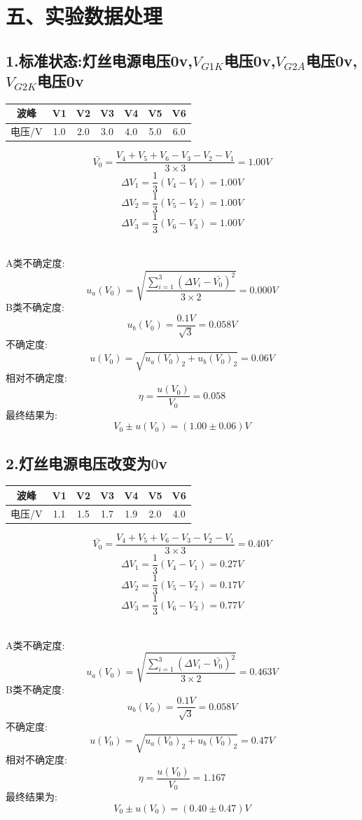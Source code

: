 \documentclass[11pt,a4paper,oneside]{article}
\begin{document}
\section*{五、实验数据处理}
\subsection*{1.标准状态:灯丝电源电压0v,$V_{G1K}$电压0v,$V_{G2A}$电压0v,$V_{G2K}$电压0v}
\begin{center}
\begin{tabular}{|c|c|c|c|c|c|c|}
	\hline
	波峰&V1&V2&V3&V4&V5&V6
	\\\hline
	电压/V&1.0&2.0&3.0&4.0&5.0&6.0\\\hline
	\end{tabular}
	\end{center}

$$  \bar{V_0}=\frac{V_4+V_5+V_6-V_3-V_2-V_1}{3\times 3}=1.00V $$
$$	\Delta V_1=\frac{1}{3}(V_4-V_1)=1.00V $$
$$	\Delta V_2=\frac{1}{3}(V_5-V_2)=1.00V $$
$$	\Delta V_3=\frac{1}{3}(V_6-V_3)=1.00V $$ 

\ \\
A类不确定度:
$$	u_a(V_0)=\sqrt{\frac{\sum\limits_{i=1}^{3} (\Delta V_i-\bar{V_0})^2}{3\times 2}}=0.000V $$
B类不确定度:
$$	u_b(V_0)=\frac{0.1V}{\sqrt{3}}=0.058V $$
不确定度:
$$	u(V_0)=\sqrt{u_a(V_0)_2+u_b(V_0)_2}=0.06V $$
相对不确定度:
$$	\eta=\frac{u(V_0)}{V_0}=0.058 $$
最终结果为:
$$	V_0 \pm u(V_0) = (1.00 \pm 0.06)V $$


\subsection*{2.灯丝电源电压改变为$0$v}
\begin{center}
\begin{tabular}{|c|c|c|c|c|c|c|}
	\hline
	波峰&V1&V2&V3&V4&V5&V6
	\\\hline
	电压/V&1.1&1.5&1.7&1.9&2.0&4.0\\\hline
	\end{tabular}
	\end{center}

$$  \bar{V_0}=\frac{V_4+V_5+V_6-V_3-V_2-V_1}{3\times 3}=0.40V $$
$$	\Delta V_1=\frac{1}{3}(V_4-V_1)=0.27V $$
$$	\Delta V_2=\frac{1}{3}(V_5-V_2)=0.17V $$
$$	\Delta V_3=\frac{1}{3}(V_6-V_3)=0.77V $$ 

\ \\
A类不确定度:
$$	u_a(V_0)=\sqrt{\frac{\sum\limits_{i=1}^{3} (\Delta V_i-\bar{V_0})^2}{3\times 2}}=0.463V $$
B类不确定度:
$$	u_b(V_0)=\frac{0.1V}{\sqrt{3}}=0.058V $$
不确定度:
$$	u(V_0)=\sqrt{u_a(V_0)_2+u_b(V_0)_2}=0.47V $$
相对不确定度:
$$	\eta=\frac{u(V_0)}{V_0}=1.167 $$
最终结果为:
$$	V_0 \pm u(V_0) = (0.40 \pm 0.47)V $$
\end{document}
